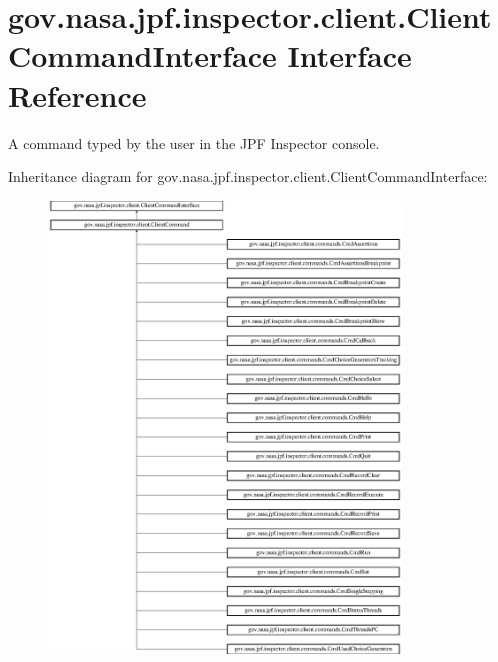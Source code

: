 \hypertarget{interfacegov_1_1nasa_1_1jpf_1_1inspector_1_1client_1_1_client_command_interface}{}\section{gov.\+nasa.\+jpf.\+inspector.\+client.\+Client\+Command\+Interface Interface Reference}
\label{interfacegov_1_1nasa_1_1jpf_1_1inspector_1_1client_1_1_client_command_interface}


A command typed by the user in the J\+PF Inspector console.  


Inheritance diagram for gov.\+nasa.\+jpf.\+inspector.\+client.\+Client\+Command\+Interface\+:\begin{figure}[H]
\begin{center}
\leavevmode
\includegraphics[height=12.000000cm]{interfacegov_1_1nasa_1_1jpf_1_1inspector_1_1client_1_1_client_command_interface}
\end{center}
\end{figure}

